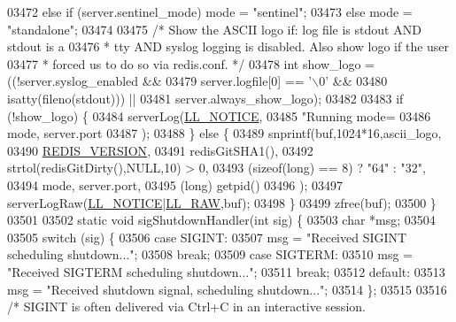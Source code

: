 \begin{DoxyCode}
{{{{{{{{{{{{{{{{{{{{{{{{{{{{{{{{{{{{{{{{{{{{{{{{{{{{{{{{{{{{{{{{{{{{{{{{{{{{{{{{{{{{{{{{{{{{{{{{{{{{{{{{{{{{{{{{{{{{{{{{{{{{{{{{{{{{{{{{{{{{{{{{{{{{{{{{{{{{{{{{{{{{{{{{{{{03472     \textcolor{keywordflow}{else} \textcolor{keywordflow}{if} (server.sentinel\_mode) mode = \textcolor{stringliteral}{"sentinel"};
03473     \textcolor{keywordflow}{else} mode = \textcolor{stringliteral}{"standalone"};
03474 
03475     \textcolor{comment}{/* Show the ASCII logo if: log file is stdout AND stdout is a}
03476 \textcolor{comment}{     * tty AND syslog logging is disabled. Also show logo if the user}
03477 \textcolor{comment}{     * forced us to do so via redis.conf. */}
03478     \textcolor{keywordtype}{int} show\_logo = ((!server.syslog\_enabled &&
03479                       server.logfile[0] == \textcolor{stringliteral}{'\(\backslash\)0'} &&
03480                       isatty(fileno(stdout))) ||
03481                      server.always\_show\_logo);
03482 
03483     \textcolor{keywordflow}{if} (!show\_logo) \{
03484         serverLog(\hyperlink{server_8h_a8c54c191e436c7dd3012167212692401}{LL\_NOTICE},
03485             \textcolor{stringliteral}{"Running mode=%
03486             mode, server.port
03487         );
03488     \} \textcolor{keywordflow}{else} \{
03489         snprintf(buf,1024*16,ascii\_logo,
03490             \hyperlink{version_8h_a357a0d302ef7fbb42bf2db0632b9f7fe}{REDIS\_VERSION},
03491             redisGitSHA1(),
03492             strtol(redisGitDirty(),NULL,10) > 0,
03493             (\textcolor{keyword}{sizeof}(\textcolor{keywordtype}{long}) == 8) ? \textcolor{stringliteral}{"64"} : \textcolor{stringliteral}{"32"},
03494             mode, server.port,
03495             (\textcolor{keywordtype}{long}) getpid()
03496         );
03497         serverLogRaw(\hyperlink{server_8h_a8c54c191e436c7dd3012167212692401}{LL\_NOTICE}|\hyperlink{server_8h_a6b3768a4d2dfb3ac580b8d999baa9350}{LL\_RAW},buf);
03498     \}
03499     zfree(buf);
03500 \}
03501 
03502 \textcolor{keyword}{static} \textcolor{keywordtype}{void} sigShutdownHandler(\textcolor{keywordtype}{int} sig) \{
03503     \textcolor{keywordtype}{char} *msg;
03504 
03505     \textcolor{keywordflow}{switch} (sig) \{
03506     \textcolor{keywordflow}{case} SIGINT:
03507         msg = \textcolor{stringliteral}{"Received SIGINT scheduling shutdown..."};
03508         \textcolor{keywordflow}{break};
03509     \textcolor{keywordflow}{case} SIGTERM:
03510         msg = \textcolor{stringliteral}{"Received SIGTERM scheduling shutdown..."};
03511         \textcolor{keywordflow}{break};
03512     \textcolor{keywordflow}{default}:
03513         msg = \textcolor{stringliteral}{"Received shutdown signal, scheduling shutdown..."};
03514     \};
03515 
03516     \textcolor{comment}{/* SIGINT is often delivered via Ctrl+C in an interactive session.}
}}}}}}}}}}}}}}}}}}}}}}}}}}}}}}}}}}}}}}}}}}}}}}}}}}}}}}}}}}}}}}}}}}}}}}}}}}}}}}}}}}}}}}}}}}}}}}}}}}}}}}}}}}}}}}}}}}}}}}}}}}}}}}}}}}}}}}}}}}}}}}}}}}}}}}}}}}}}}}}}}}}}}}}}}}}}
\end{DoxyCode}
